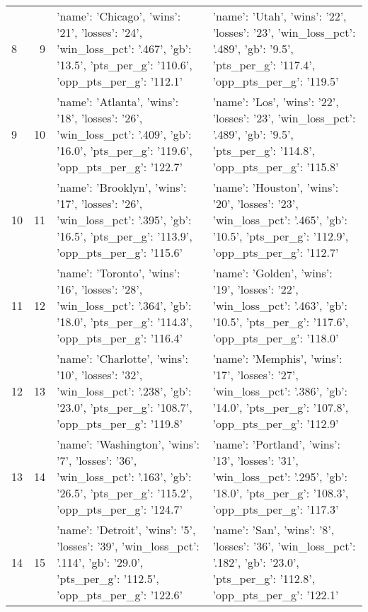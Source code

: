 \begin{tabular}{lrll}
8 & 9 & {'name': 'Chicago', 'wins': '21', 'losses': '24', 'win_loss_pct': '.467', 'gb': '13.5', 'pts_per_g': '110.6', 'opp_pts_per_g': '112.1'} & {'name': 'Utah', 'wins': '22', 'losses': '23', 'win_loss_pct': '.489', 'gb': '9.5', 'pts_per_g': '117.4', 'opp_pts_per_g': '119.5'} \\
9 & 10 & {'name': 'Atlanta', 'wins': '18', 'losses': '26', 'win_loss_pct': '.409', 'gb': '16.0', 'pts_per_g': '119.6', 'opp_pts_per_g': '122.7'} & {'name': 'Los', 'wins': '22', 'losses': '23', 'win_loss_pct': '.489', 'gb': '9.5', 'pts_per_g': '114.8', 'opp_pts_per_g': '115.8'} \\
10 & 11 & {'name': 'Brooklyn', 'wins': '17', 'losses': '26', 'win_loss_pct': '.395', 'gb': '16.5', 'pts_per_g': '113.9', 'opp_pts_per_g': '115.6'} & {'name': 'Houston', 'wins': '20', 'losses': '23', 'win_loss_pct': '.465', 'gb': '10.5', 'pts_per_g': '112.9', 'opp_pts_per_g': '112.7'} \\
11 & 12 & {'name': 'Toronto', 'wins': '16', 'losses': '28', 'win_loss_pct': '.364', 'gb': '18.0', 'pts_per_g': '114.3', 'opp_pts_per_g': '116.4'} & {'name': 'Golden', 'wins': '19', 'losses': '22', 'win_loss_pct': '.463', 'gb': '10.5', 'pts_per_g': '117.6', 'opp_pts_per_g': '118.0'} \\
12 & 13 & {'name': 'Charlotte', 'wins': '10', 'losses': '32', 'win_loss_pct': '.238', 'gb': '23.0', 'pts_per_g': '108.7', 'opp_pts_per_g': '119.8'} & {'name': 'Memphis', 'wins': '17', 'losses': '27', 'win_loss_pct': '.386', 'gb': '14.0', 'pts_per_g': '107.8', 'opp_pts_per_g': '112.9'} \\
13 & 14 & {'name': 'Washington', 'wins': '7', 'losses': '36', 'win_loss_pct': '.163', 'gb': '26.5', 'pts_per_g': '115.2', 'opp_pts_per_g': '124.7'} & {'name': 'Portland', 'wins': '13', 'losses': '31', 'win_loss_pct': '.295', 'gb': '18.0', 'pts_per_g': '108.3', 'opp_pts_per_g': '117.3'} \\
14 & 15 & {'name': 'Detroit', 'wins': '5', 'losses': '39', 'win_loss_pct': '.114', 'gb': '29.0', 'pts_per_g': '112.5', 'opp_pts_per_g': '122.6'} & {'name': 'San', 'wins': '8', 'losses': '36', 'win_loss_pct': '.182', 'gb': '23.0', 'pts_per_g': '112.8', 'opp_pts_per_g': '122.1'} \\
\end{tabular}


